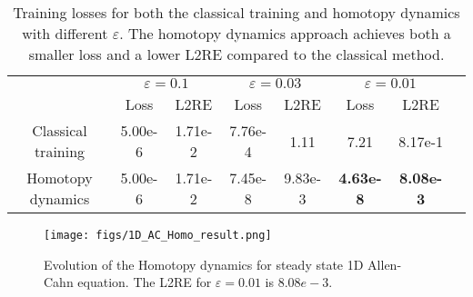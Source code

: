\begin{table}[t]
    \caption{Training losses for both the classical training and homotopy dynamics with different $\varepsilon$. The homotopy dynamics approach achieves both a smaller loss and a lower L2RE compared to the classical method.
    }
    \vskip 0.15in
    \centering
    \tiny
    \begin{tabular}{|c|c|c|c|c|c|c|c|} 
    \hline 
    \multirow{2}{*}{} & \multicolumn{2}{c|}{$\varepsilon = 0.1$} & \multicolumn{2}{c|}{$\varepsilon = 0.03$} & \multicolumn{2}{c|}{$\varepsilon = 0.01$} \\ \cline{2-7}
                               & Loss & L2RE & Loss & L2RE & Loss & L2RE \\ \hline 
    Classical training                        & 5.00e-6     & 1.71e-2     & 7.76e-4     & 1.11    & 7.21     & 8.17e-1     \\ \hline 
    Homotopy dynamics                     & 5.00e-6    & 1.71e-2     & 7.45e-8    & 9.83e-3     & \textbf{4.63e-8}     & \textbf{8.08e-3}     \\ \hline
    \end{tabular}
    \label{tab:1D_Allen_loss_l2re_comparison}
\end{table}


\begin{figure}[t]
    \centering
    \texttt{[image: figs/1D\_AC\_Homo\_result.png]}
    \caption{Evolution of the Homotopy dynamics for steady state 1D Allen-Cahn equation. The L2RE for $\varepsilon=0.01$ is $8.08e-3$.}
    \label{fig:1d_allen_cahn_homo_result}
\end{figure}
